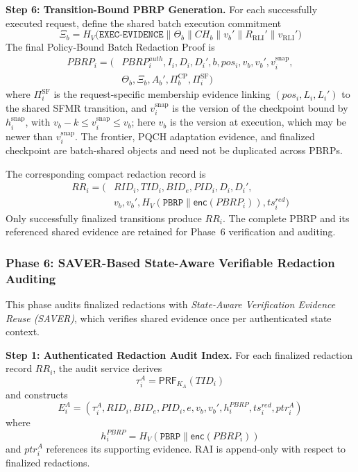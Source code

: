 \documentclass[lettersize,journal]{IEEEtran}
\begin{document}
\medskip
\noindent\textbf{Step 6: Transition-Bound PBRP Generation.}
For each successfully executed request, define the shared batch
execution commitment
\begin{equation}
\Xi_b=
H_V\big(\texttt{EXEC-EVIDENCE}\parallel
\Theta_b\parallel CH_b\parallel v_b'\parallel
R_{\mathrm{RLI}}'\parallel v_{\mathrm{RLI}}'\big)
\label{eq:xi}
\end{equation}
The final Policy-Bound Batch Redaction Proof is
\begin{equation}
\begin{aligned}
PBRP_i=\big(
&PBRP_i^{auth},I_i,D_i,D_i',
b,pos_i,v_b,v_b',v_i^{\mathrm{snap}},\\
&\Theta_b,\Xi_b,A_b',\Pi_b^{\mathrm{CP}},\Pi_i^{\mathrm{SF}}\big)
\end{aligned}
\label{eq:pbrp}
\end{equation}
where $\Pi_i^{\mathrm{SF}}$ is the request-specific membership evidence
linking $(pos_i,L_i,L_i')$ to the shared SFMR transition,
and $v_i^{\mathrm{snap}}$ is the version of the checkpoint bound by
$h_i^{\mathrm{snap}}$, with $v_b-k\le v_i^{\mathrm{snap}}\le v_b$; here
$v_b$ is the version at execution, which may be newer than
$v_i^{\mathrm{snap}}$. The frontier,
PQCH adaptation evidence, and finalized checkpoint are batch-shared
objects and need not be duplicated across PBRPs.

The corresponding compact redaction record is
\begin{equation}
\begin{aligned}
RR_i=\big(
&RID_i,TID_i,BID_e,PID_i,D_i,D_i',\\
&v_b,v_b',H_V(\texttt{PBRP}\parallel
\mathsf{enc}(PBRP_i)),ts_i^{red}\big)
\end{aligned}
\end{equation}
Only successfully finalized transitions produce $RR_i$. The complete
PBRP and its referenced shared evidence are retained for Phase~6
verification and auditing.


\subsubsection*{\textbf{Phase 6: SAVER-Based State-Aware
Verifiable Redaction Auditing}}

This phase audits finalized redactions with \emph{State-Aware
Verification Evidence Reuse (SAVER)}, which verifies shared evidence once
per authenticated state context.

\medskip
\noindent\textbf{Step 1: Authenticated Redaction Audit Index.}
For each finalized redaction record $RR_i$, the audit service derives
\begin{equation}
\tau_i^A=\mathsf{PRF}_{K_A}(TID_i)
\end{equation}
and constructs
\begin{equation}
E_i^A=
(\tau_i^A,RID_i,BID_e,PID_i,e,v_b,v_b',
h_i^{PBRP},ts_i^{red},ptr_i^A)
\end{equation}
where
\begin{equation}
h_i^{PBRP}
=
H_V(\texttt{PBRP}\parallel\mathsf{enc}(PBRP_i))
\end{equation}
and $ptr_i^A$ references its supporting evidence. RAI is append-only
with respect to finalized redactions.
\end{document}
